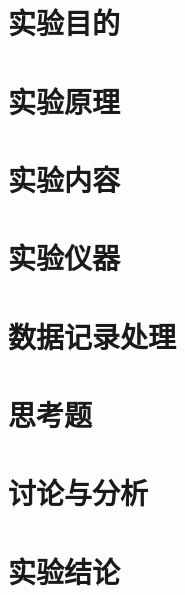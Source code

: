 \documentclass[a4paper, zihao=5, fontset=fandol]{ctexart}
\begin{document}
\section*{实验目的}

\section*{实验原理}

\section*{实验内容}

\section*{实验仪器}

\section*{数据记录处理}

\section*{思考题}

\section*{讨论与分析}

\section*{实验结论}
\end{document}
